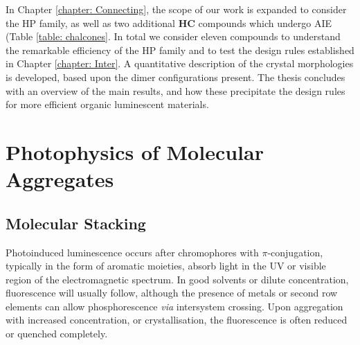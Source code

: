 In Chapter \ref{chapter: Connecting}, the scope of our work is expanded to consider the \ac{HP} family, as well as two additional \textbf{HC} compounds which undergo AIE (Table \ref{table: chalcones}. In total we consider eleven compounds to understand the remarkable efficiency of the \ac{HP} family and to test the design rules established in Chapter \ref{chapter: Inter}. A quantitative description of the crystal morphologies is developed, based upon the dimer configurations present. The thesis concludes with an overview of the main results, and how these precipitate the design rules for more efficient organic luminescent materials. 
\section{Photophysics of Molecular Aggregates}\label{section: lom ACQ}
\subsection{Molecular Stacking}
Photoinduced luminescence occurs after chromophores with $\pi$-conjugation, typically in the form of aromatic moieties, absorb light in the \ac{UV} or visible region of the electromagnetic spectrum. In good solvents or dilute concentration, fluorescence will usually follow, although the presence of metals or second row elements can allow phosphorescence \textit{via} intersystem crossing. Upon aggregation with increased concentration, or crystallisation, the fluorescence is often reduced or quenched completely. 


